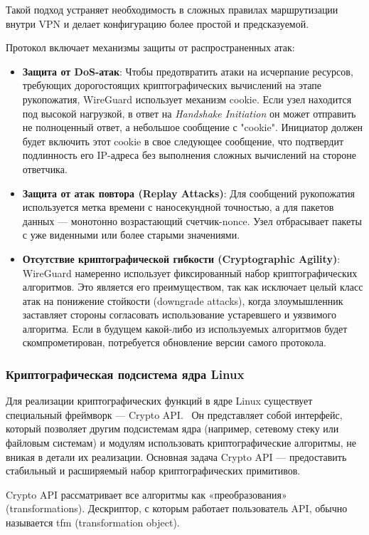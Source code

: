 Такой подход устраняет необходимость в сложных правилах маршрутизации внутри VPN и делает конфигурацию более простой и предсказуемой.

Протокол включает механизмы защиты от распространенных атак:
\begin{itemize}
    \item \textbf{Защита от DoS-атак}: Чтобы предотвратить атаки на исчерпание ресурсов, требующих дорогостоящих криптографических вычислений на этапе рукопожатия, WireGuard использует механизм cookie.
    Если узел находится под высокой нагрузкой, в ответ на \textit{Handshake Initiation} он может отправить не полноценный ответ, а небольшое сообщение с "cookie".
    Инициатор должен будет включить этот cookie в свое следующее сообщение, что подтвердит подлинность его IP-адреса без выполнения сложных вычислений на стороне ответчика.
    \item \textbf{Защита от атак повтора (Replay Attacks)}: Для сообщений рукопожатия используется метка времени с наносекундной точностью, а для пакетов данных — монотонно возрастающий счетчик-nonce.
    Узел отбрасывает пакеты с уже виденными или более старыми значениями.
    \item \textbf{Отсутствие криптографической гибкости (Cryptographic Agility)}: WireGuard намеренно использует фиксированный набор криптографических алгоритмов.
    Это является его преимуществом, так как исключает целый класс атак на понижение стойкости (downgrade attacks), когда злоумышленник заставляет стороны согласовать использование устаревшего и уязвимого алгоритма.
    Если в будущем какой-либо из используемых алгоритмов будет скомпрометирован, потребуется обновление версии самого протокола.
\end{itemize}

\subsubsection{Криптографическая подсистема ядра Linux}
Для реализации криптографических функций в ядре Linux существует специальный фреймворк — Crypto API.~\cite{crypto_api_doc}
Он представляет собой интерфейс, который позволяет другим подсистемам ядра (например, сетевому стеку или файловым системам) и модулям использовать криптографические алгоритмы, не вникая в детали их реализации.
Основная задача Crypto API — предоставить стабильный и расширяемый набор криптографических примитивов.

Crypto API рассматривает все алгоритмы как «преобразования» (transformations).
Дескриптор, с которым работает пользователь API, обычно называется tfm (transformation object).\\

